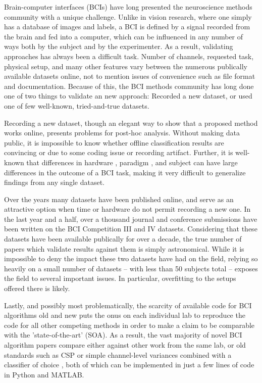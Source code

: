Brain-computer interfaces (BCIs) have long presented the neuroscience methods
community with a unique challenge. Unlike in vision research, where one
simply has a database of images and labels, a BCI is defined by a signal
recorded from the brain and fed into a computer, which can be influenced in any
number of ways both by the subject and by the experimenter. As a result,
validating approaches has always been a difficult task. Number of channels,
requested task, physical setup, and many other features vary between the
numerous publically available datasets online, not to mention issues of
convenience such as file format and documentation. Because of this, the BCI
methods community has long done one of two things to validate an new approach:
Recorded a new dataset, or used one of few well-known, tried-and-true datasets.

Recording a new dataset, though an elegant way to show that a proposed
method works online, presents problems for post-hoc analysis. Without
making data public, it is impossible to know whether offline
classification results are convincing or due to some coding issue or
recording artifact. Further, it is well-known that differences in
hardware \cite{Searle2000,Lopez-Gordo2014}, paradigm \cite{Allison2010}, and
subject \cite{Allison2010} can have large differences in the
outcome of a BCI task, making it very difficult to generalize findings
from any single dataset.

Over the years many datasets have been published online, and serve as an
attractive option when time or hardware do not permit recording a new one. In
the last year and a half, over a thousand journal and conference submissions
have been written on the BCI Competition III \cite{Blankertz2006,Schloegl2005}
and IV \cite{Tangermann2012} datasets. Considering that these datasets have been
available publically for over a decade, the true number of papers which validate
results against them is simply astronomical. While it is impossible to deny
the impact these two datasets have had on the field, relying so heavily on
a small number of datasets -- with less than 50 subjects total -- exposes the field
to several important issues. In particular, overfitting to the setups offered
there is likely.

Lastly, and possibly most problematically, the scarcity of available
code for BCI algorithms old and new puts the onus on each
individual lab to reproduce the code for all other competing methods
in order to make a claim to be comparable with the 'state-of-the-art'
(SOA). As a result, the vast majority of novel BCI algorithm papers
compare either against other work from the same lab, or old standards
such as CSP \cite{Koles1990} or simple channel-level
variances combined with a classifier of choice \cite{Garrett2003},
both of which can be implemented in just a few lines of code in Python and MATLAB.

